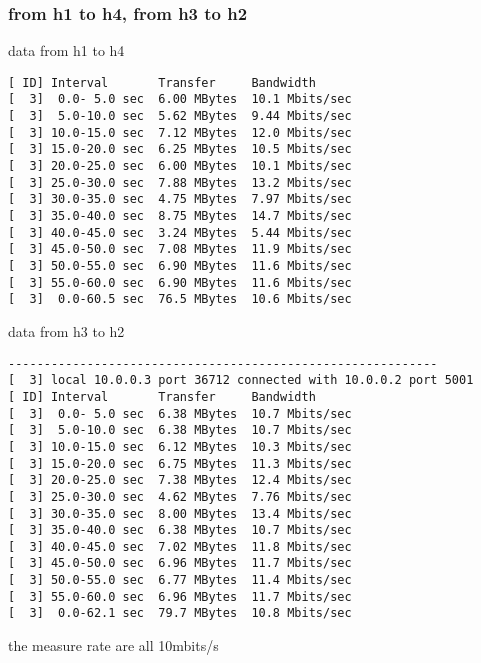\documentclass[11pt]{article}
\begin{document}
\subsubsection{from h1 to h4, from h3 to h2}
\label{sec:org17414ad}
data from h1 to h4
\begin{verbatim}
[ ID] Interval       Transfer     Bandwidth
[  3]  0.0- 5.0 sec  6.00 MBytes  10.1 Mbits/sec
[  3]  5.0-10.0 sec  5.62 MBytes  9.44 Mbits/sec
[  3] 10.0-15.0 sec  7.12 MBytes  12.0 Mbits/sec
[  3] 15.0-20.0 sec  6.25 MBytes  10.5 Mbits/sec
[  3] 20.0-25.0 sec  6.00 MBytes  10.1 Mbits/sec
[  3] 25.0-30.0 sec  7.88 MBytes  13.2 Mbits/sec
[  3] 30.0-35.0 sec  4.75 MBytes  7.97 Mbits/sec
[  3] 35.0-40.0 sec  8.75 MBytes  14.7 Mbits/sec
[  3] 40.0-45.0 sec  3.24 MBytes  5.44 Mbits/sec
[  3] 45.0-50.0 sec  7.08 MBytes  11.9 Mbits/sec
[  3] 50.0-55.0 sec  6.90 MBytes  11.6 Mbits/sec
[  3] 55.0-60.0 sec  6.90 MBytes  11.6 Mbits/sec
[  3]  0.0-60.5 sec  76.5 MBytes  10.6 Mbits/sec
\end{verbatim}
data from h3 to h2
\begin{verbatim}
------------------------------------------------------------
[  3] local 10.0.0.3 port 36712 connected with 10.0.0.2 port 5001
[ ID] Interval       Transfer     Bandwidth
[  3]  0.0- 5.0 sec  6.38 MBytes  10.7 Mbits/sec
[  3]  5.0-10.0 sec  6.38 MBytes  10.7 Mbits/sec
[  3] 10.0-15.0 sec  6.12 MBytes  10.3 Mbits/sec
[  3] 15.0-20.0 sec  6.75 MBytes  11.3 Mbits/sec
[  3] 20.0-25.0 sec  7.38 MBytes  12.4 Mbits/sec
[  3] 25.0-30.0 sec  4.62 MBytes  7.76 Mbits/sec
[  3] 30.0-35.0 sec  8.00 MBytes  13.4 Mbits/sec
[  3] 35.0-40.0 sec  6.38 MBytes  10.7 Mbits/sec
[  3] 40.0-45.0 sec  7.02 MBytes  11.8 Mbits/sec
[  3] 45.0-50.0 sec  6.96 MBytes  11.7 Mbits/sec
[  3] 50.0-55.0 sec  6.77 MBytes  11.4 Mbits/sec
[  3] 55.0-60.0 sec  6.96 MBytes  11.7 Mbits/sec
[  3]  0.0-62.1 sec  79.7 MBytes  10.8 Mbits/sec
\end{verbatim}

the measure rate are all 10mbits/s
\end{document}

